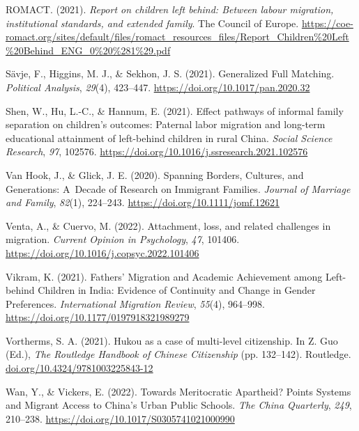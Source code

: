 \documentclass[
  man,floatsintext]{apa7}
\newlength{\cslhangindent}
\newlength{\cslentryspacingunit} %
\newenvironment{CSLReferences}[2] %
 {%
  \setlength{\parindent}{0pt}
  \ifodd #1
  \let\oldpar\par
  \def\par{\hangindent=\cslhangindent\oldpar}
  \fi
  \setlength{\parskip}{#2\cslentryspacingunit}
 }%
 {}
\begin{document}
\begin{CSLReferences}{1}{0}
\leavevmode{}%
ROMACT. (2021). \emph{Report on children left behind: Between labour migration, institutional standards, and extended family}. The Council of Europe. \url{https://coe-romact.org/sites/default/files/romact_resources_files/Report_Children\%20Left\%20Behind_ENG_0\%20\%281\%29.pdf}

\leavevmode{}%
Sävje, F., Higgins, M. J., \& Sekhon, J. S. (2021). Generalized Full Matching. \emph{Political Analysis}, \emph{29}(4), 423--447. \url{https://doi.org/10.1017/pan.2020.32}

\leavevmode{}%
Shen, W., Hu, L.-C., \& Hannum, E. (2021). Effect pathways of informal family separation on children's outcomes: Paternal labor migration and long-term educational attainment of left-behind children in rural {China}. \emph{Social Science Research}, \emph{97}, 102576. \url{https://doi.org/10.1016/j.ssresearch.2021.102576}

\leavevmode{}%
Van Hook, J., \& Glick, J. E. (2020). Spanning Borders, Cultures, and Generations: A~Decade of Research on Immigrant Families. \emph{Journal of Marriage and Family}, \emph{82}(1), 224--243. \url{https://doi.org/10.1111/jomf.12621}

\leavevmode{}%
Venta, A., \& Cuervo, M. (2022). Attachment, loss, and related challenges in migration. \emph{Current Opinion in Psychology}, \emph{47}, 101406. \url{https://doi.org/10.1016/j.copsyc.2022.101406}

\leavevmode{}%
Vikram, K. (2021). Fathers{'} Migration and Academic Achievement among Left-behind Children in India: Evidence of Continuity and Change in Gender Preferences. \emph{International Migration Review}, \emph{55}(4), 964--998. \url{https://doi.org/10.1177/0197918321989279}

\leavevmode{}%
Vortherms, S. A. (2021). Hukou as a case of multi-level citizenship. In Z. Guo (Ed.), \emph{The Routledge Handbook of Chinese Citizenship} (pp. 132--142). Routledge. \href{https://doi.org/10.4324/9781003225843-12}{doi.org/10.4324/9781003225843-12}

\leavevmode{}%
Wan, Y., \& Vickers, E. (2022). Towards Meritocratic Apartheid? Points Systems and Migrant Access to {China}'s Urban Public Schools. \emph{The {China} Quarterly}, \emph{249}, 210--238. \url{https://doi.org/10.1017/S0305741021000990}


\end{CSLReferences}
\end{document}
